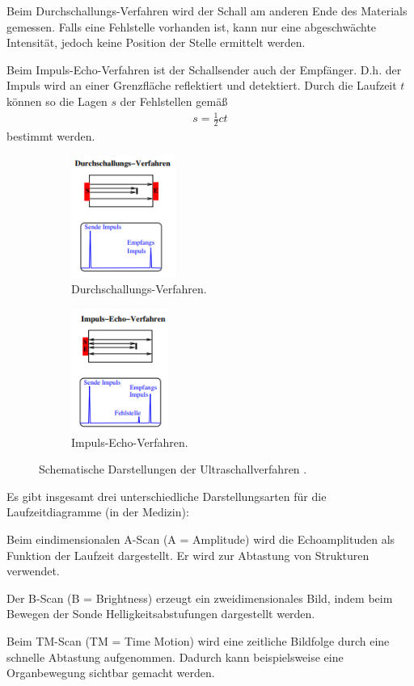 \noindent
Beim Durchschallungs-Verfahren wird der Schall am anderen Ende des Materials gemessen.
Falls eine Fehlstelle vorhanden ist, kann nur eine abgeschwächte Intensität, jedoch keine Position der Stelle ermittelt werden.

\noindent
Beim Impuls-Echo-Verfahren ist der Schallsender auch der Empfänger.
D.h. der Impuls wird an einer Grenzfläche reflektiert und detektiert.
Durch die Laufzeit $t$ können so die Lagen $s$ der Fehlstellen gemäß
\begin{align}
    s = \frac{1}{2} c t
\end{align} 
bestimmt werden.

\begin{figure}[H]%
    \begin{subfigure}{0.48\textwidth}%
        \centering%
        \includegraphics[height = 4cm]{abbildungen/durchschallung.png}%
        \caption{Durchschallungs-Verfahren.}%
        \label{fig:durchschallung}%
    \end{subfigure}%
    \hfill%
    \begin{subfigure}{0.48\textwidth}%
        \centering%
        \includegraphics[height = 4cm]{abbildungen/impuls-echo.png}%
        \caption{Impuls-Echo-Verfahren.}%
        \label{fig:impuls-echo}%
    \end{subfigure}%
    \caption{Schematische Darstellungen der Ultraschallverfahren \cite{man:us1}.}%
    \label{fig:verfahren}%
\end{figure}%
\noindent

\noindent
Es gibt insgesamt drei unterschiedliche Darstellungsarten für die Laufzeitdiagramme (in der Medizin):

\noindent
Beim eindimensionalen A-Scan (A = Amplitude) wird die Echoamplituden als Funktion der Laufzeit dargestellt. 
Er wird zur Abtastung von Strukturen verwendet.

\noindent
Der B-Scan (B = Brightness) erzeugt ein zweidimensionales Bild, indem beim Bewegen der Sonde Helligkeitsabstufungen dargestellt werden.

\noindent
Beim TM-Scan (TM = Time Motion) wird eine zeitliche Bildfolge durch eine schnelle Abtastung aufgenommen.
Dadurch kann beispielsweise eine Organbewegung sichtbar gemacht werden.

